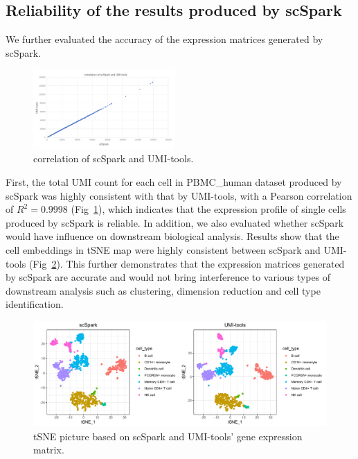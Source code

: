 \documentclass[conference]{IEEEtran}
\begin{document}
\subsection{Reliability of the results produced by scSpark} 
We further evaluated the accuracy of the expression matrices generated by scSpark.
\begin{figure}
	\includegraphics[width=0.48\textwidth]{fig6.pdf}
	\caption{correlation of scSpark and UMI-tools.} \label{fig8}
\end{figure}
First, the total UMI count for each cell in PBMC\_human dataset produced by scSpark was highly consistent with that by UMI-tools, with a Pearson correlation of $R^{2} = 0.9998$ (Fig~\ref{fig8}), which indicates that the expression profile of single cells produced by scSpark is reliable.
In addition, we also evaluated whether scSpark would have influence on downstream biological analysis.
Results show that the cell embeddings in tSNE map were highly consistent between scSpark and UMI-tools (Fig~\ref{fig9}).
This further demonstrates that the expression matrices generated by scSpark are accurate and would not bring interference to various types of downstream analysis such as clustering, dimension reduction and cell type identification.

\begin{figure}
  \includegraphics[width=\textwidth]{fig7.pdf}
  \caption{tSNE picture based on scSpark and UMI-tools' gene expression matrix.} \label{fig9}
\end{figure}
\end{document}
